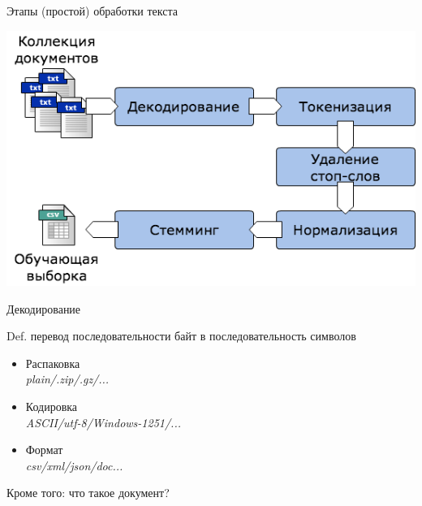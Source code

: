 \documentclass[aspectratio=169]{beamer}
\begin{document}

\begin{frame}{Этапы (простой) обработки текста}

\begin{center}
\includegraphics[scale=0.5]{images/textm.png}
\end{center}

\end{frame}


\begin{frame}{Декодирование}

\begin{block}{Def.}
перевод последовательности байт в последовательность символов
\end{block}

\begin{itemize}
\item Распаковка \\
{\it plain/.zip/.gz/...}
\item Кодировка \\
{\it ASCII/utf-8/Windows-1251/...}
\item Формат \\
{\it csv/xml/json/doc...}
\end{itemize}

Кроме того: что такое документ?

\end{frame}

\end{document}
